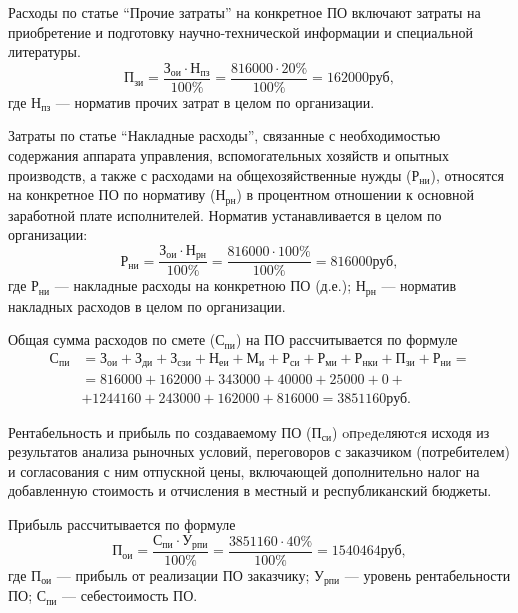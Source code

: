 Расходы по статье ``Прочие затраты'' на конкретное ПО включают затраты на приобретение и подготовку научно-технической информации и специальной литературы.
\begin{displaymath}
  \text{П}_{\text{зи}} = \frac{\text{З}_{\text{ои}} \cdot \text{Н}_{\text{пз}}}{100\%} = \frac{816000 \cdot 20\%}{100\%} = 162000 \text{руб},
\end{displaymath}
где \( \text{Н}_{\text{пз}} \) --- норматив прочих затрат в целом по организации.

Затраты по статье ``Накладные расходы'', связанные с необходимостью содержания аппарата управления, вспомогательных хозяйств и опытных производств, а также с расходами на общехозяйственные нужды (\( \text{Р}_{\text{ни}} \)), относятся на конкретное ПО по нормативу (\( \text{Н}_{\text{рн}} \)) в процентном отношении к основной заработной плате исполнителей. Норматив устанавливается в целом по организации:
\begin{displaymath}
  \text{Р}_{\text{ни}} = \frac{\text{З}_{\text{ои}} \cdot \text{Н}_{\text{рн}}}{100\%} = \frac{816000 \cdot 100\%}{100\%} = 816000 \text{руб},
\end{displaymath}
где \( \text{Р}_{\text{ни}} \) --- накладные расходы на конкретною ПО (д.е.); \( \text{Н}_{\text{рн}} \) --- норматив накладных расходов в целом по организации.

Общая сумма расходов по смете (\( \text{С}_{\text{пи}} \)) на ПО рассчитывается по формуле
\begin{align*}
  \text{С}_{\text{пи}} &= \text{З}_{\text{ои}} + \text{З}_{\text{ди}} + \text{З}_{\text{сзи}} + \text{Н}_{\text{еи}} + \text{М}_{\text{и}} + \text{Р}_{\text{си}} + \text{Р}_{\text{ми}} + \text{Р}_{\text{нки}} + \text{П}_{\text{зи}} + \text{Р}_{\text{ни}} =\\
  &= 816000 + 162000 + 343000 + 40000 + 25000 + 0 +\\
  &+ 1244160 + 243000 + 162000 + 816000 = 3851160 \text{руб}.
\end{align*}

Рентабельность и прибыль по создаваемому ПО (\( \text{П}_{\text{си}} \)) oпpeдeляютcя исходя из результатов анализа рыночных условий, переговоров с заказчиком (потребителем) и согласования с ним отпускной цены, включающей дополнительно налог на добавленную стоимость и отчисления в местный и республиканский бюджеты.

Прибыль рассчитывается по формуле
\begin{displaymath}
  \text{П}_{\text{ои}} = \frac{\text{С}_{\text{пи}} \cdot \text{У}_{\text{рпи}}}{100\%} = \frac{3851160 \cdot 40\%}{100\%} = 1540464 \text{руб},
\end{displaymath}
где \( \text{П}_{\text{ои}} \) --- прибыль от реализации ПО заказчику; \( \text{У}_{\text{рпи}} \) --- уровень рентабельности ПО; \( \text{С}_{\text{пи}} \) --- себестоимость ПО.

